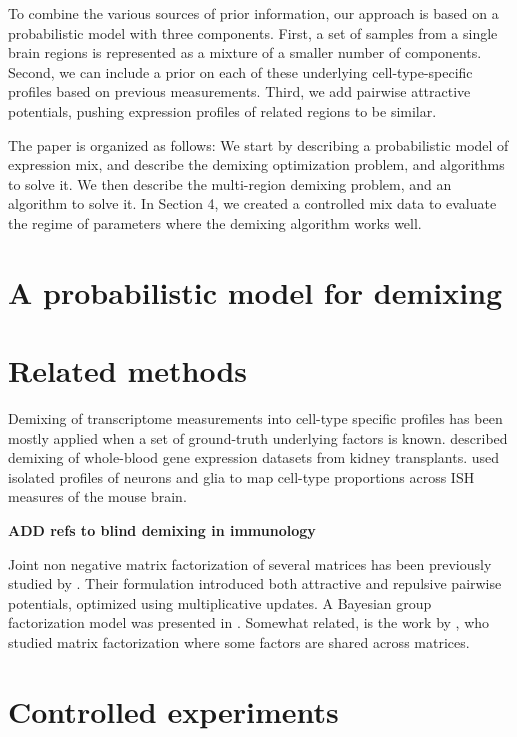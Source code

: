 \documentclass{article} %
\begin{document}
To combine the various sources of prior information, our approach is based on a probabilistic model with three components. First, a set of samples from a single brain regions is represented as a mixture of a smaller number of components. Second, we can include a prior on each of these underlying cell-type-specific profiles based on previous measurements. Third, we add pairwise attractive potentials, pushing expression profiles of related regions to be similar.
 
The paper is organized as follows: We start by describing a probabilistic model of expression mix, and describe the demixing optimization problem, and algorithms to solve it. We then describe the multi-region demixing problem, and an algorithm to solve it. In Section 4, we created a controlled mix data to evaluate the regime of parameters where the demixing algorithm works well. 


\section{A probabilistic model for demixing}


\section{Related methods}
Demixing of transcriptome measurements into cell-type specific profiles has been mostly applied when a set of ground-truth underlying factors is known. \citet{shen2010cell} described demixing of 
whole-blood gene expression datasets from kidney transplants. \citet{grange2014cell} used isolated profiles of neurons and glia \cite{okaty2011cell} to map cell-type proportions across ISH measures of the mouse brain.

{\bf {ADD refs to blind demixing in immunology}}

Joint non negative matrix factorization of several matrices has been previously studied by \citet{lee2009group}. Their formulation introduced  both attractive and repulsive pairwise potentials, optimized using multiplicative updates. A Bayesian group factorization model was presented in \citet{shin2012bayesian}. Somewhat related, is the work by \citet{wang2012group}, who studied matrix factorization where some factors are shared across matrices.






\section{Controlled experiments}
\end{document}
